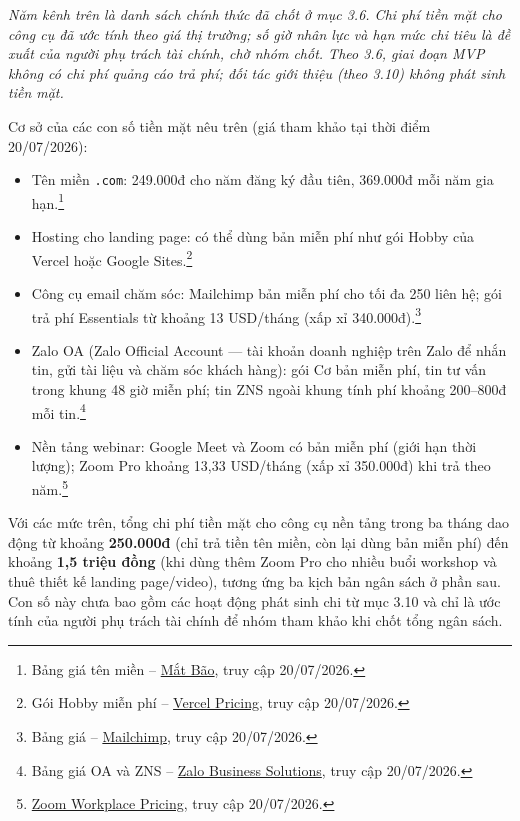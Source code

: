 {\footnotesize\itshape Năm kênh trên là danh sách chính thức đã chốt ở mục 3.6. Chi phí tiền mặt cho công cụ đã ước tính theo giá thị trường; số giờ nhân lực và hạn mức chi tiêu là đề xuất của người phụ trách tài chính, chờ nhóm chốt. Theo 3.6, giai đoạn MVP không có chi phí quảng cáo trả phí; đối tác giới thiệu (theo 3.10) không phát sinh tiền mặt.}

Cơ sở của các con số tiền mặt nêu trên (giá tham khảo tại thời điểm 20/07/2026):

\begin{itemize}
    \item Tên miền \texttt{.com}: 249.000đ cho năm đăng ký đầu tiên, 369.000đ mỗi năm gia hạn.\footnote{Bảng giá tên miền -- \href{https://www.matbao.net/ten-mien/bang-gia-ten-mien.html}{Mắt Bão}, truy cập 20/07/2026.}
    \item Hosting cho landing page: có thể dùng bản miễn phí như gói Hobby của Vercel hoặc Google Sites.\footnote{Gói Hobby miễn phí -- \href{https://vercel.com/pricing}{Vercel Pricing}, truy cập 20/07/2026.}
    \item Công cụ email chăm sóc: Mailchimp bản miễn phí cho tối đa 250 liên hệ; gói trả phí Essentials từ khoảng 13 USD/tháng (xấp xỉ 340.000đ).\footnote{Bảng giá -- \href{https://mailchimp.com/pricing/marketing/}{Mailchimp}, truy cập 20/07/2026.}
    \item Zalo OA (Zalo Official Account --- tài khoản doanh nghiệp trên Zalo để nhắn tin, gửi tài liệu và chăm sóc khách hàng): gói Cơ bản miễn phí, tin tư vấn trong khung 48 giờ miễn phí; tin ZNS ngoài khung tính phí khoảng 200--800đ mỗi tin.\footnote{Bảng giá OA và ZNS -- \href{https://zalo.solutions/oa/pricing}{Zalo Business Solutions}, truy cập 20/07/2026.}
    \item Nền tảng webinar: Google Meet và Zoom có bản miễn phí (giới hạn thời lượng); Zoom Pro khoảng 13,33 USD/tháng (xấp xỉ 350.000đ) khi trả theo năm.\footnote{\href{https://zoom.us/pricing}{Zoom Workplace Pricing}, truy cập 20/07/2026.}
\end{itemize}

Với các mức trên, tổng chi phí tiền mặt cho công cụ nền tảng trong ba tháng dao động từ khoảng \textbf{250.000đ} (chỉ trả tiền tên miền, còn lại dùng bản miễn phí) đến khoảng \textbf{1,5 triệu đồng} (khi dùng thêm Zoom Pro cho nhiều buổi workshop và thuê thiết kế landing page/video), tương ứng ba kịch bản ngân sách ở phần sau. Con số này chưa bao gồm các hoạt động phát sinh chi từ mục 3.10 và chỉ là ước tính của người phụ trách tài chính để nhóm tham khảo khi chốt tổng ngân sách.

